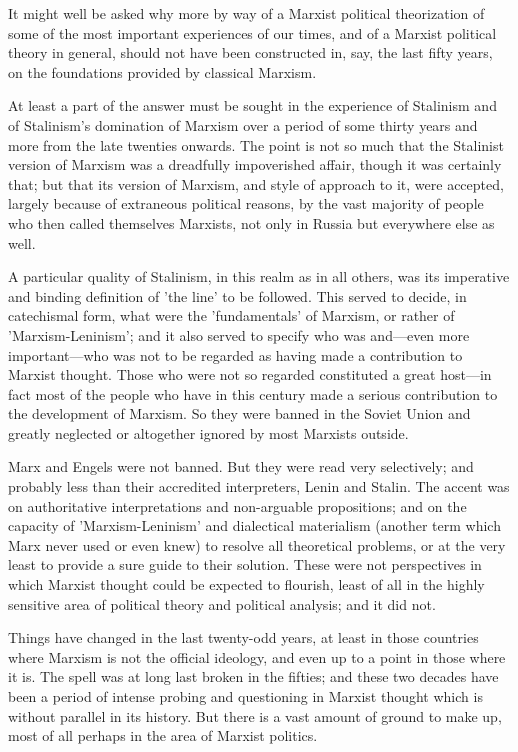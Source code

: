 It might well be asked why more by way of a Marxist political theorization of some of the most important experiences of our times, and of a Marxist political theory in general, should not have been constructed in, say, the last fifty years, on the foundations provided by classical Marxism.

At least a part of the answer must be sought in the experience of Stalinism and of Stalinism's domination of Marxism over a period of some thirty years and more from the late twenties onwards. The point is not so much that the Stalinist version of Marxism was a dreadfully impoverished affair, though it was certainly that; but that its version of Marxism, and style of approach to it, were accepted, largely because of extraneous political reasons, by the vast majority of people who then called themselves Marxists, not only in Russia but everywhere else as well.

A particular quality of Stalinism, in this realm as in all others, was its imperative and binding definition of 'the line' to be followed. This served to decide, in catechismal form, what were the 'fundamentals' of Marxism, or rather of 'Marxism-Leninism'; and it also served to specify who was and—even more important—who was not to be regarded as having made a contribution to Marxist thought. Those who were not so regarded constituted a great host—in fact most of the people who have in this century made a serious contribution to the development of Marxism. So they were banned in the Soviet Union and greatly neglected or altogether ignored by most Marxists outside.

Marx and Engels were not banned. But they were read very selectively; and probably less than their accredited interpreters, Lenin and Stalin. The accent was on authoritative interpretations and non-arguable propositions; and on the capacity of 'Marxism-Leninism' and dialectical materialism (another term which Marx never used or even knew) to resolve all theoretical problems, or at the very least to provide a sure guide to their solution. These were not perspectives in which Marxist thought could be expected to flourish, least of all in the highly sensitive area of political theory and political analysis; and it did not.

Things have changed in the last twenty-odd years, at least in those countries where Marxism is not the official ideology, and even up to a point in those where it is. The spell was at long last broken in the fifties; and these two decades have been a period of intense probing and questioning in Marxist thought which is without parallel in its history. But there is a vast amount of ground to make up, most of all perhaps in the area of Marxist politics.

